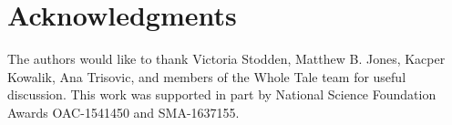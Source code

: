 
\section*{Acknowledgments}
The authors would like to thank Victoria Stodden, Matthew B. Jones,
Kacper Kowalik, Ana Trisovic, and members of the Whole Tale team for useful discussion.
This work was supported in part by National Science Foundation Awards
OAC-1541450 and SMA-1637155.
